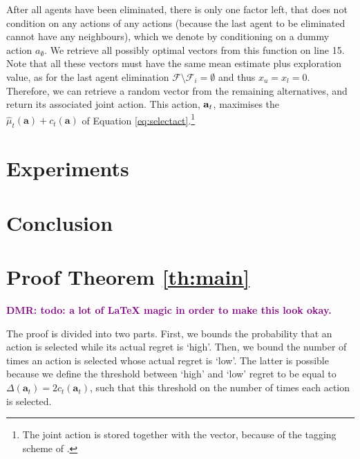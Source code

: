 \documentclass{article}
\newcommand{\est}{\hat{\mu}}
\newcommand{\dmr}[1]{\textcolor{purple}{\bf DMR: #1}}
\begin{document}
After all agents have been eliminated, there is only one factor left, that does not condition on any actions of any actions (because the last agent to be eliminated cannot have any neighbours), which we denote by conditioning on a dummy action $a_\emptyset$. We retrieve all possibly optimal vectors from this function on line 15. Note that all these vectors must have the same mean estimate plus exploration value, as for the last agent elimination $\mathcal{F} \setminus \mathcal{F}_i = \emptyset$ and thus $x_u = x_l = 0$. Therefore, we can retrieve a random vector from the remaining alternatives, and return its associated joint action. This action, ${\bf a}_t$, maximises the $\est_t(\mathbf{a}) + c_t(\mathbf{a})$ of Equation \ref{eq:selectact}.\footnote{The joint action is stored together with the vector, because of the tagging scheme of \cite{roijers13computing,roijers2015computing}.}

\section{Experiments}\label{sec:exp}

\section{Conclusion}




\appendix

\section{Proof Theorem \ref{th:main}}
\dmr{todo: a lot of LaTeX magic in order to make this look okay.}

The proof is divided into two parts. First, we bounds the probability that an action is selected while its actual regret is `high'. Then, we bound the number of times an action is selected whose actual regret is `low'. The latter is possible because we define the threshold between `high' and `low' regret to be equal to $\Delta(\mathbf{a}_t) = 2 c_t(\mathbf{a}_t)$, such that this threshold on the number of times each action is selected.
\end{document}
